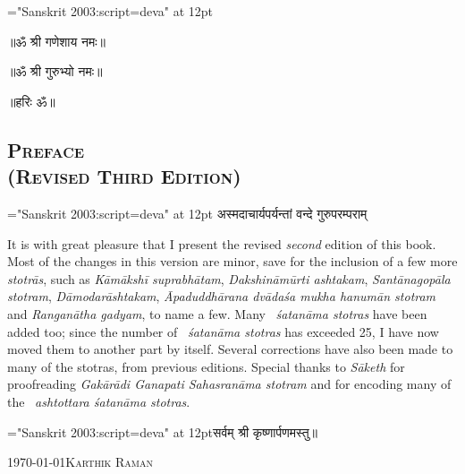 {\font \x="Sanskrit 2003:script=deva" at 12pt\x
\centerline{॥ॐ श्री गणेशाय नमः॥}
\centerline{॥ॐ श्री गुरुभ्यो नमः॥}
\centerline{॥हरिः ॐ॥}
}
\thispagestyle{fancyplain}

\begin{center}
\chapter*{\texorpdfstring{\scshape{Preface\\(Revised Third Edition)}}{Preface\\(Revised Third Edition)}}
\end{center}

{\font \x="Sanskrit 2003:script=deva" at 12pt\x
{}
{अस्मदाचार्यपर्यन्तां वन्दे गुरुपरम्पराम्}
}

It is with great pleasure that I present the revised \emph{second} edition of this book. Most of the changes in this version are minor, save for the inclusion of a few more \emph{stotrās}, such as \textit{Kāmākshī suprabhātam}, \textit{Dakshināmūrti ashtakam}, \textit{Santānagopāla stotram}, \textit{Dāmodarāshtakam}, \textit{Āpaduddhārana  dvādaśa mukha hanu\-mān stotram} and \textit{Ranganātha gadyam}, to name a few. Many ~\textit{śatanāma stotras} have been added too; since the number of ~\textit{śatanāma stotras} has exceeded 25, I have now moved them to another part by itself. Several corrections have also been made to many of the stotras, from previous editions. Special thanks to \textit{Sāketh} for proofreading \textit{Gakārādi Ganapati Sahasranāma stotram} and for encoding many of the ~\textit{ashtottara śatanāma stotras}.\\ 



\centerline{\font \x="Sanskrit 2003:script=deva" at 12pt\x सर्वम् श्री कृष्णार्पणमस्तु॥}

\medskip
\noindent\today \hfill \textsc{Karthik Raman}
